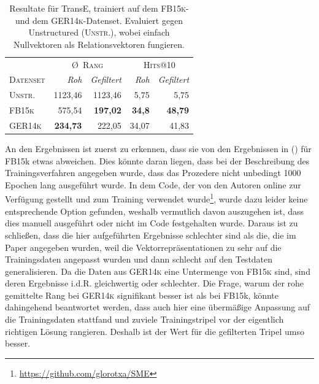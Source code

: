 \begin{table}[h]
  \centering
  \def\arraystretch{1.5}
  \begin{tabular}{@{}lrrrr@{}}
    \toprule
     & \multicolumn{2}{c}{\textsc{\O\ Rang}} & \multicolumn{2}{c}{\textsc{Hits@10}} \\ \cmidrule(l{2pt}r{2pt}){2-3} \cmidrule(l{2pt}r{2pt}){4-5}
     \textsc{Datenset} & \emph{Roh} & \emph{Gefiltert} & \emph{Roh} & \emph{Gefiltert} \\
     \toprule
     \textsc{Unstr.} & 1123,46 & 1123,46 & 5,75 & 5,75 \\
     \textsc{FB15k} & 575,54 & \textbf{197,02} & \textbf{34,8} & \textbf{48,79} \\
     \textsc{GER14k} & \textbf{234,73} & 222,05 & 34,07 & 41,83 \\
     \bottomrule
  \end{tabular}
  \caption[Resultate für TransE mit \textsc{FB15k} und \textsc{GER14k}]{Resultate für TransE, trainiert auf dem
  \textsc{FB15k}- und dem \textsc{GER14k}-Datenset. Evaluiert gegen Unstructured (\textsc{Unstr.}), wobei einfach
  Nullvektoren als Relationsvektoren fungieren.\label{fig:results1}}
\end{table}

An den Ergebnissen ist zuerst zu erkennen, dass sie von den Ergebnissen in (\cite{bordes2013translating}) für FB15k etwas abweichen.
Dies könnte daran liegen, dass bei der Beschreibung des Trainingsverfahren angegeben wurde, dass das Prozedere
nicht unbedingt 1000 Epochen lang ausgeführt wurde. In dem Code, der von den Autoren online zur Verfügung gestellt und
zum Training verwendet wurde\footnote{\url{https://github.com/glorotxa/SME}}, wurde dazu leider keine entsprechende Option gefunden, weshalb vermutlich davon auszugehen
ist, dass dies manuell ausgeführt oder nicht im Code festgehalten wurde.
Daraus ist zu schließen, dass die hier aufgeführten Ergebnisse schlechter sind als die,
die im Paper angegeben wurden, weil die Vektorrepräsentationen zu sehr auf die Trainingsdaten angepasst wurden und dann schlecht
auf den Testdaten generalisieren. Da die Daten aus \textsc{GER14k} eine Untermenge von \textsc{FB15k} sind, sind deren Ergebnisse
i.d.R. gleichwertig oder schlechter. Die Frage, warum der rohe gemittelte Rang bei \textsc{GER14k} signifikant besser ist als
bei FB15k, könnte dahingehend beantwortet werden, dass auch hier eine übermäßige Anpassung auf die Trainingsdaten stattfand und
zuviele Trainingstripel vor der eigentlich richtigen Lösung rangieren. Deshalb ist der Wert für die gefilterten Tripel umso
besser.


